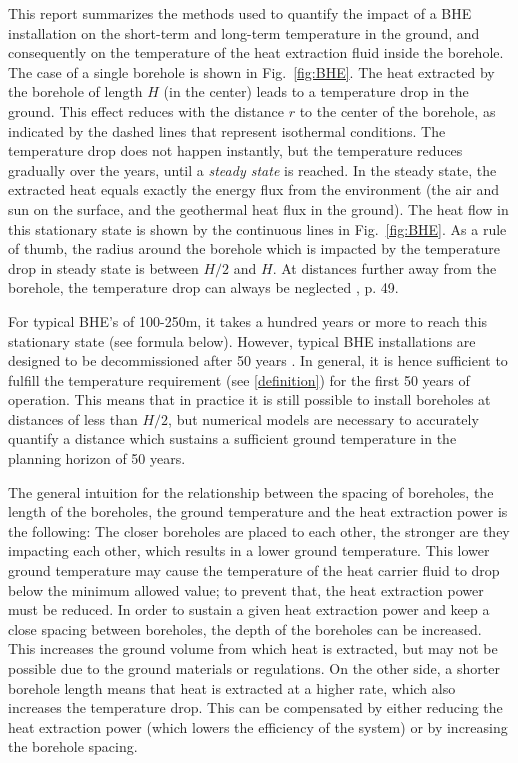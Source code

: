 This report summarizes the methods used to quantify the impact of a BHE installation on the short-term and long-term temperature in the ground, and consequently on the temperature of the heat extraction fluid inside the borehole. The case of a single borehole is shown in Fig.~\ref{fig:BHE}. The heat extracted by the borehole of length $H$ (in the center) leads to a temperature drop in the ground. This effect reduces with the distance $r$ to the center of the borehole, as indicated by the dashed lines that represent isothermal conditions. The temperature drop does not happen instantly, but the temperature reduces gradually over the years, until a \textit{steady state} is reached. In the steady state, the extracted heat equals exactly the energy flux from the environment (the air and sun on the surface, and the geothermal heat flux in the ground). The heat flow in this stationary state is shown by the continuous lines in Fig.~\ref{fig:BHE}. As a rule of thumb, the radius around the borehole which is impacted by the temperature drop in steady state is between $H/2$ and $H$. At distances further away from the borehole, the temperature drop can always be neglected \cite{pahud_geothermal_2002}, p. 49.

For typical BHE's of 100-250m, it takes a hundred years or more to reach this stationary state (see formula below). However, typical BHE installations are designed to be decommissioned after 50 years \citep{sia_sondes_2010}. In general, it is hence sufficient to fulfill the temperature requirement (see \ref{definition}) for the first 50 years of operation. This means that in practice it is still possible to install boreholes at distances of less than $H/2$, but numerical models are necessary to accurately quantify a distance which sustains a sufficient ground temperature in the planning horizon of 50 years.

The general intuition for the relationship between the spacing of boreholes, the length of the boreholes, the ground temperature and the heat extraction power is the following:
The closer boreholes are placed to each other, the stronger are they impacting each other, which results in a lower ground temperature. 
This lower ground temperature may cause the temperature of the heat carrier fluid to drop below the minimum allowed value; to prevent that, the heat extraction power must be reduced. 
In order to sustain a given heat extraction power and keep a close spacing between boreholes, the depth of the boreholes can be increased. This increases the ground volume from which heat is extracted, but may not be possible due to the ground materials or regulations. 
On the other side, a shorter borehole length means that heat is extracted at a higher rate, which also increases the temperature drop. This can be compensated by either reducing the heat extraction power (which lowers the efficiency of the system) or by increasing the borehole spacing.

